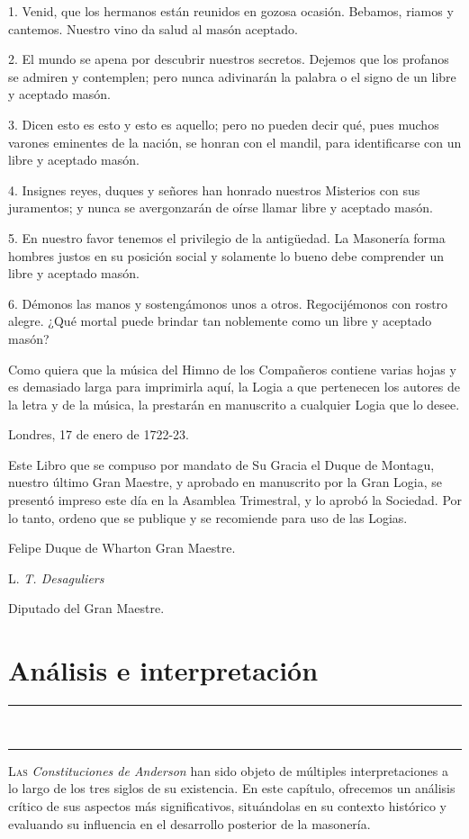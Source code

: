 \documentclass[a4paper,12pt,twoside]{book}
\newcommand{\ornline}{%
\begin{center}
\textcolor{dorado}{{\LARGE\rule{0.2\textwidth}{0.4pt}}~\scalebox{1.2}{❧}~\scalebox{1.2}{❧}~\scalebox{1.2}{❧}~
{\LARGE\rule{0.2\textwidth}{0.4pt}}}
\end{center}}
\begin{document}
1. Venid, que los hermanos están reunidos en gozosa ocasión. Bebamos, riamos y cantemos. Nuestro vino da salud al masón aceptado.

2. El mundo se apena por descubrir nuestros secretos. Dejemos que los profanos se admiren y contemplen; pero nunca adivinarán la palabra o el signo de un libre y aceptado masón.

3. Dicen esto es esto y esto es aquello; pero no pueden decir qué, pues muchos varones eminentes de la nación, se honran con el mandil, para identificarse con un libre y aceptado masón.

4. Insignes reyes, duques y señores han honrado nuestros Misterios con sus juramentos; y nunca se avergonzarán de oírse llamar libre y aceptado masón.

5. En nuestro favor tenemos el privilegio de la antigüedad. La Masonería forma hombres justos en su posición social y solamente lo bueno debe comprender un libre y aceptado masón.

6. Démonos las manos y sostengámonos unos a otros. Regocijémonos con rostro alegre. ¿Qué mortal puede brindar tan noblemente como un libre y aceptado masón?

Como quiera que la música del Himno de los Compañeros contiene varias hojas y es demasiado larga para imprimirla aquí, la Logia a que pertenecen los autores de la letra y de la música, la prestarán en manuscrito a cualquier Logia que lo desee. 

Londres, 17 de enero de 1722-23. 

Este Libro que se compuso por mandato de Su Gracia el Duque de Montagu, nuestro último Gran Maestre, y aprobado en manuscrito por la Gran Logia, se presentó impreso este día en la Asamblea Trimestral, y lo aprobó la Sociedad. Por lo tanto, ordeno que se publique y se recomiende para uso de las Logias. 

Felipe Duque de Wharton Gran Maestre. 

L. \textit{T. Desaguliers} 

Diputado del Gran Maestre.

\chapter{Análisis e interpretación}

\ornline
\vspace{1cm}

\lettrine[lines=3, lhang=0.1, loversize=0.1]{\textcolor{borgoña}{L}}{as} \textit{Constituciones de Anderson} han sido objeto de múltiples interpretaciones a lo largo de los tres siglos de su existencia. En este capítulo, ofrecemos un análisis crítico de sus aspectos más significativos, situándolas en su contexto histórico y evaluando su influencia en el desarrollo posterior de la masonería.
\end{document}
